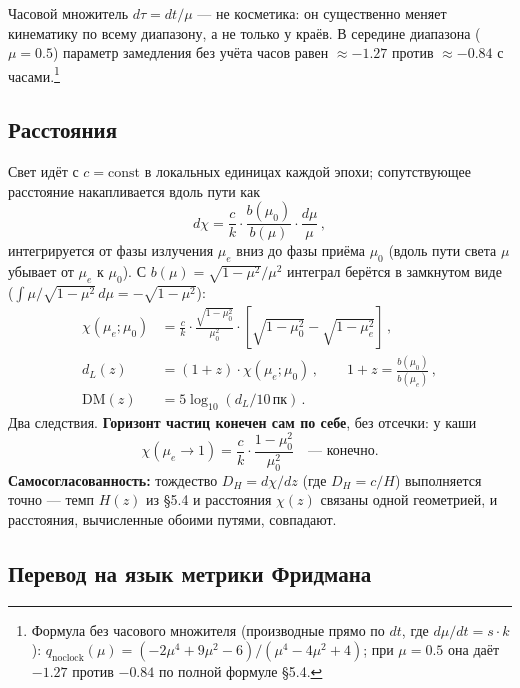 \documentclass{article}
\begin{document}
Часовой множитель $d\tau = dt/\mu$ --- не косметика: он существенно меняет кинематику по всему диапазону, а не только у краёв. В середине диапазона ($\mu = 0.5$) параметр замедления без учёта часов равен $\approx -1.27$ против $\approx -0.84$ с часами.\footnote{Формула без часового множителя (производные прямо по $dt$, где $d\mu/dt = s\cdot k$): $q_{\text{noclock}}(\mu) = (-2\mu^4 + 9\mu^2 - 6)/(\mu^4 - 4\mu^2 + 4)$; при $\mu = 0.5$ она даёт $-1.27$ против $-0.84$ по полной формуле \S5.4.}

\subsection{Расстояния}

Свет идёт с $c = \text{const}$ в локальных единицах каждой эпохи; сопутствующее расстояние накапливается вдоль пути как
\begin{equation}
d\chi = \frac{c}{k} \cdot \frac{b(\mu_0)}{b(\mu)} \cdot \frac{d\mu}{\mu}\,,
\end{equation}
интегрируется от фазы излучения $\mu_e$ вниз до фазы приёма $\mu_0$ (вдоль пути света $\mu$ убывает от $\mu_e$ к $\mu_0$). С $b(\mu) = \sqrt{1 - \mu^2}/\mu^2$ интеграл берётся в замкнутом виде ($\int \mu/\sqrt{1 - \mu^2}\, d\mu = -\sqrt{1 - \mu^2}$):
\begin{align}
\chi(\mu_e; \mu_0) &= \frac{c}{k} \cdot \frac{\sqrt{1 - \mu_0^2}}{\mu_0^2} \cdot \left[ \sqrt{1 - \mu_0^2} - \sqrt{1 - \mu_e^2} \right]\,, \\
d_L(z) &= (1 + z)\cdot\chi(\mu_e; \mu_0)\,, \qquad 1 + z = \frac{b(\mu_0)}{b(\mu_e)}\,, \\
\text{DM}(z) &= 5\log_{10}(d_L / 10\,\text{пк})\,.
\end{align}
Два следствия. \textbf{Горизонт частиц конечен сам по себе}, без отсечки: у каши
\begin{equation}
\chi(\mu_e \to 1) = \frac{c}{k}\cdot\frac{1 - \mu_0^2}{\mu_0^2} \quad \text{--- конечно.}
\end{equation}
\textbf{Самосогласованность:} тождество $D_H = d\chi/dz$ (где $D_H = c/H$) выполняется точно --- темп $H(z)$ из \S5.4 и расстояния $\chi(z)$ связаны одной геометрией, и расстояния, вычисленные обоими путями, совпадают.

\subsection{Перевод на язык метрики Фридмана}
\end{document}
